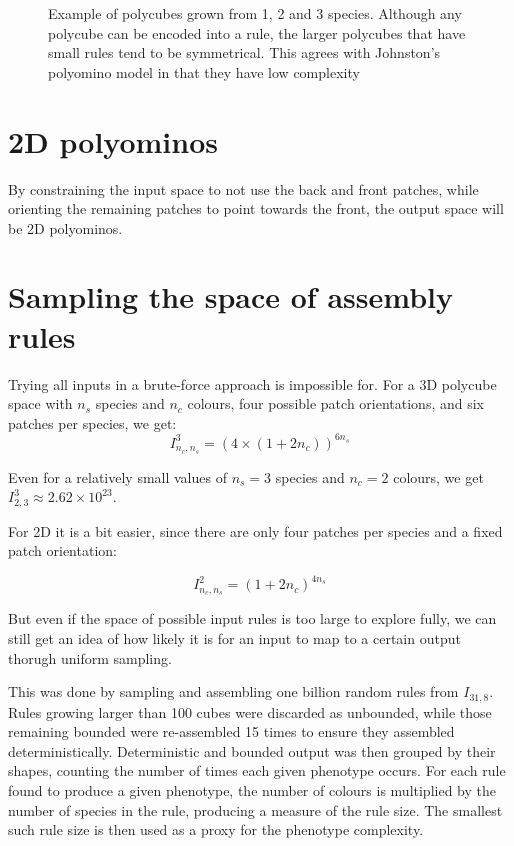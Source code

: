 \begin{figure}
\caption{Example of polycubes grown from 1, 2 and 3 species. Although any polycube can be encoded into a rule, the larger polycubes that have small rules tend to be symmetrical. This agrees with Johnston's polyomino model in that they have low complexity}
\label{fig:poly_examples}\end{figure}

\section{2D polyominos}
By constraining the input space to not use the back and front patches, while orienting the remaining patches to point towards the front, the output space will be 2D polyominos.

\section{Sampling the space of assembly rules}
Trying all inputs in a brute-force approach is impossible for. For a 3D polycube space with \(n_s\) species and \(n_c\) colours, four possible patch orientations, and six patches per species, we get: 
\[
I_{n_c, n_s}^3 = (4 \times (1+2n_c))^{6n_s}
\]

Even for a relatively small values of \(n_s=3\) species and \(n_c=2\) colours, we get \(I_{2, 3}^3 \approx 2.62 \times 10^{23}\).

For 2D it is a bit easier, since there are only four patches per species and a fixed patch orientation:

\[
I_{n_c, n_s}^2 = (1+2n_c)^{4n_s}
\]

But even if the space of possible input rules is too large to explore fully, we can still get an idea of how likely it is for an input to map to a certain output thorugh uniform sampling.

This was done by sampling and assembling one billion random rules from \(I_{31, 8}\). Rules growing larger than 100 cubes were discarded as unbounded, while those remaining bounded were re-assembled 15 times to ensure they assembled deterministically. Deterministic and bounded output was then grouped by their shapes, counting the number of times each given phenotype occurs. For each rule found to produce a given phenotype, the number of colours is multiplied by the number of species in the rule, producing a measure of the rule size. The smallest such rule size is then used as a proxy for the phenotype complexity.


